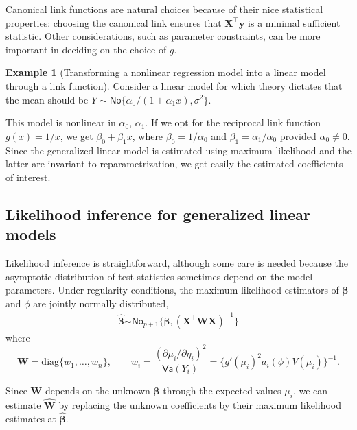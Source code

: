 \documentclass[
  11pt,
  letterpaper,
]{book}
\theoremstyle{definition}
\theoremstyle{definition}
\newtheorem{example}{Example}[chapter]
\theoremstyle{definition}
\theoremstyle{definition}
\theoremstyle{remark}
\begin{document}
Canonical link functions are natural choices because of their nice
statistical properties: choosing the canonical link ensures that
\(\mathbf{X}^\top\boldsymbol{y}\) is a minimal sufficient statistic. Other
considerations, such as parameter constraints, can be more important in
deciding on the choice of \(g\).

\begin{example}[Transforming a nonlinear regression model into a linear model through a link function]
\protect\hypertarget{exm:inverslinklm}{}\label{exm:inverslinklm}Consider a linear model for which theory dictates that the mean should be \(Y \sim \mathsf{No}\{\alpha_0/(1+\alpha_1x), \sigma^2\}\).

This model is nonlinear in \(\alpha_0\), \(\alpha_1\). If we opt for the reciprocal link function \(g(x)=1/x\), we get \(\beta_0+\beta_1 x\), where \(\beta_0 = 1/\alpha_0\) and \(\beta_1 = \alpha_1/\alpha_0\) provided \(\alpha_0 \neq 0\). Since the generalized linear model is estimated using maximum likelihood and the latter are invariant to reparametrization, we get easily the estimated coefficients of interest.
\end{example}

\hypertarget{likelihood-inference-for-generalized-linear-models}{%
\subsection{Likelihood inference for generalized linear models}\label{likelihood-inference-for-generalized-linear-models}}

Likelihood inference is straightforward, although some care is needed because the asymptotic distribution of test statistics sometimes depend on the model parameters. Under regularity conditions, the maximum likelihood estimators of \(\boldsymbol{\beta}\) and \(\phi\) are jointly normally distributed,
\begin{align*}
\widehat{\boldsymbol{\beta}} \stackrel{\cdot}{\sim}\mathsf{No}_{p+1}\{\boldsymbol{\beta}, (\mathbf{X}^\top\mathbf{W}\mathbf{X})^{-1}\}
\end{align*}
where
\[\mathbf{W} = \mathrm{diag}\{w_1,\ldots, w_n\}, \qquad w_i = \frac{\left(\partial \mu_i/\partial \eta_i\right)^2}{\mathsf{Va}(Y_i)}=\{g'(\mu_i)^2a_i(\phi)V(\mu_i)\}^{-1}.
\]

Since \(\mathbf{W}\) depends on the unknown \(\boldsymbol{\beta}\) through
the expected values \(\mu_i\), we can estimate \(\widehat{\mathbf{W}}\) by
replacing the unknown coefficients by their maximum likelihood estimates
at \(\widehat{\boldsymbol{\beta}}\).
\end{document}
